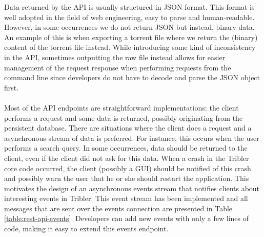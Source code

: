 \noindent Data returned by the API is usually structured in JSON format. This format is well adopted in the field of web engineering, easy to parse and human-readable. However, in some occurrences we do not return JSON but instead, binary data. An example of this is when exporting a torrent file where we return the (binary) content of the torrent file instead. While introducing some kind of inconsistency in the API, sometimes outputting the raw file instead allows for easier management of the request response when performing requests from the command line since developers do not have to decode and parse the JSON object first.\\\\
Most of the API endpoints are straightforward implementations: the client performs a request and some data is returned, possibly originating from the persistent database. There are situations where the client does a request and a asynchronous stream of data is preferred. For instance, this occurs when the user performs a search query. In some occurrences, data should be returned to the client, even if the client did not ask for this data. When a crash in the Tribler core code occurred, the client (possibly a GUI) should be notified of this crash and possibly warn the user that he or she should restart the application. This motivates the design of an asynchronous events stream that notifies clients about interesting events in Tribler. This event stream has been implemented and all messages that are sent over the events connection are presented in Table \ref{table:rest-api-events}. Developers can add new events with only a few lines of code, making it easy to extend this events endpoint.\\

